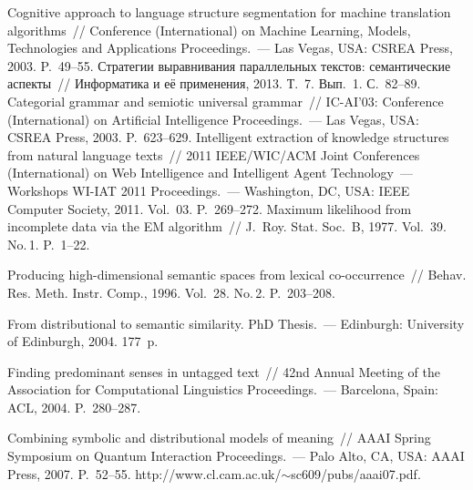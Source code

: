 \begin{multicols}{2}
{\small\frenchspacing
{%
\begin{thebibliography}{99}
   Cognitive approach to language structure segmentation for machine 
translation algorithms~// Conference (International) on Machine Learning, Models, Technologies 
and Applications Proceedings.~--- Las Vegas, USA: CSREA Press, 2003. P.~49--55.
   Стратегии выравнивания параллельных текстов: семантические 
аспекты~// Информатика и её применения, 2013. Т.~7. Вып.~1. С.~82--89.
   Categorial grammar and semiotic universal grammar~// IC-AI'03: 
  Conference (International) on Artificial Intelligence Proceedings.~--- Las Vegas, USA: 
CSREA Press, 2003. P.~623--629.
   Intelligent extraction of 
knowledge structures from natural language texts~// 2011 IEEE/WIC/ACM  Joint 
Conferences (International) on Web Intelligence and Intelligent Agent Technology~--- Workshops WI-IAT 2011 
Proceedings.~--- Washington, DC, USA: IEEE Computer Society, 
2011. Vol.~03. P.~269--272.
   Maximum likelihood from incomplete data 
via the EM algorithm~// J.~Roy. Stat. Soc.~B, 1977. Vol.~39. No.\,1. P.~1--22.


   Producing high-dimensional semantic spaces from lexical 
  co-occurrence~// Behav. Res. Meth. Instr.  Comp., 1996. Vol.~28. 
No.\,2. P.~203--208.

   From distributional to semantic similarity. PhD Thesis.~--- Edinburgh: 
University of Edinburgh, 2004. 177~p.

   Finding predominant senses in 
untagged text~// 42nd Annual Meeting of the Association for Computational Linguistics 
Proceedings.~--- Barcelona, Spain: ACL, 2004. P.~280--287.

   Combining symbolic and distributional models of meaning~// 
AAAI Spring Symposium on Quantum Interaction Proceedings.~--- 
Palo Alto, CA, USA: AAAI Press, 2007.  P.~52--55. {\sf 
http://www.cl.cam.ac.uk/$\sim$sc609/pubs/aaai07.pdf}.


\end{thebibliography}}}
\end{multicols}
